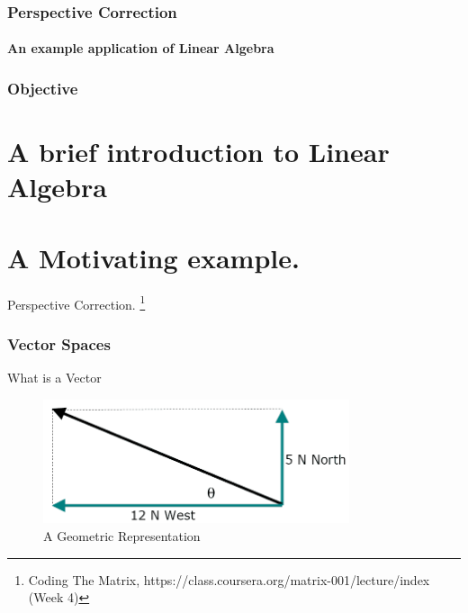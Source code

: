 
\usepackage[english]{babel}
\usepackage[utf8x]{inputenc}
\usepackage{beamerthemesplit}
\usepackage{graphicx}

\author[Surya]{Surya Gaddipati \\ \texttt{sgaddipati@groupon.com}}


\makeatletter
 \def\beamer@framenotesbegin{%
   \gdef\beamer@noteitems{}%
   \gdef\beamer@notes{{}}%
 }
 \makeatother


\begin{frame}
\titlepage
\frametitle{Perspective Correction}
\framesubtitle{An example application of Linear Algebra}
\end{frame}

\begin{frame}
\frametitle{Objective}
\tableofcontents

\section{A brief introduction to Linear Algebra}
\section{A Motivating example. }
Perspective Correction.
\footnote{Coding The Matrix, https://class.coursera.org/matrix-001/lecture/index (Week 4)}
\end{frame}


\begin{frame}
\frametitle{Vector Spaces}
\begin{center}
\begin{block}{What is a Vector}
\begin{figure}[ht!]
\centering
\includegraphics[width=90mm]{vector-example.png}
\caption{A Geometric Representation}
\label{overflow}
\end{figure}

\end{block}
\end{center}
\end{frame}






